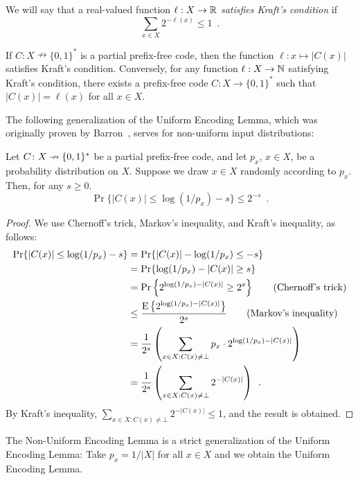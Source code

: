 \documentclass[prodmode,acmcsur]{acmsmall}
\begin{document}
We will say that a real-valued function $\ell : X \to \mathbb{R}$
\emph{satisfies Kraft's condition} if
\[
  \sum_{x \in X} 2^{-\ell(x)} \leq 1 \enspace .
\]
\begin{lem}
  If $C : X \nrightarrow \{0,1\}^*$ is a partial prefix-free code,
  then the function  $\ell : x \mapsto |C(x)|$ satisfies Kraft's condition. Conversely, for any
  function $\ell : X \to \mathbb{N}$ satisfying Kraft's condition, there
  exists a prefix-free code $C : X \to \{0, 1\}^*$ such that
  $|C(x)| = \ell(x)$ for all $x \in X$.
\end{lem}

The following generalization of the Uniform Encoding Lemma, which was
originally proven by Barron~\cite[Theorem~3.1]{barron:dissertation},
serves for non-uniform input distributions:
\begin{lem}  
  Let $C\colon X\nrightarrow\{0,1\}^*$ be a partial prefix-free code,
  and let $p_x$, $x \in X$, be a probability distribution on $X$.
  Suppose we draw $x \in X$ randomly according to $p_x$.
  Then, for any $s \geq 0$.
  \[
    \Pr\{ |C(x)| \le \log(1/p_x)-s\} \le 2^{-s} \enspace .
  \]
\end{lem}

\begin{proof}
  We use Chernoff's trick, Markov's inequality, and Kraft's
  inequality, as follows:
  \begin{align*}
    \Pr\{ |C(x)| \le\log(1/p_x)-s \}
    & = \Pr\{|C(x)| -\log(1/p_x) \le -s \} \\
    & = \Pr\{\log(1/p_x)-|C(x)| \ge s \} \\
    & = \Pr\left\{2^{\log(1/p_x)-|C(x)|} \ge 2^s \right\}  \tag{Chernoff's trick} \\
    & \le \frac{\operatorname{\mathrm{E}}\left\{2^{\log(1/p_x)-|C(x)|}\right\}}{2^s} \tag{Markov's inequality} \\
    & = \frac{1}{2^s} \left(\sum_{x\in X : C(x) \neq \bot} p_x\cdot 2^{\log(1/p_x)-|C(x)|}\right) \\
    & = \frac{1}{2^s} \left(\sum_{x\in X : C(x) \neq \bot }2^{-|C(x)|}\right) \enspace .
  \end{align*}
  By Kraft's inequality,
  $\sum_{x \in X : C(x) \neq \bot} 2^{-|C(x)|} \leq 1$, and the result
  is obtained.
\end{proof}

The Non-Uniform Encoding Lemma is a strict generalization
of the Uniform Encoding Lemma: Take $p_x=1/|X|$ for all $x\in X$ and
we obtain the Uniform Encoding Lemma.
\end{document}
